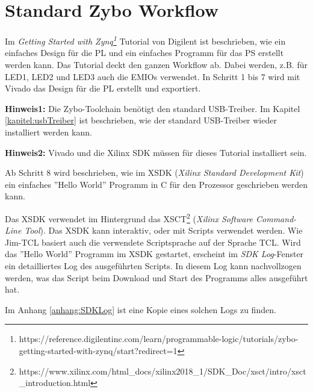 
\section{Standard Zybo Workflow}
Im \textit{Getting Started with Zynq\footnote{https://reference.digilentinc.com/learn/programmable-logic/tutorials/zybo-getting-started-with-zynq/start?redirect=1}} Tutorial von Digilent ist beschrieben, wie ein einfaches Design für die PL und ein einfaches Programm für das PS erstellt werden kann.
Das Tutorial deckt den ganzen Workflow ab.
Dabei werden, z.B. für LED1, LED2 und LED3 auch die EMIOs verwendet.
In Schritt 1 bis 7 wird mit Vivado das Design für die PL erstellt und exportiert.

\textbf{Hinweis1:} Die Zybo-Toolchain benötigt den standard USB-Treiber. Im Kapitel \ref{kapitel:usbTreiber} ist beschrieben, wie der standard USB-Treiber wieder installiert werden kann.

\textbf{Hinweis2:} Vivado und die Xilinx SDK müssen für dieses Tutorial installiert sein.

Ab Schritt 8 wird beschrieben, wie im XSDK (\textit{Xilinx Standard Development Kit}) ein einfaches ''Hello World'' Programm in C für den Prozessor geschrieben werden kann.

Das XSDK verwendet im Hintergrund das XSCT\footnote{https://www.xilinx.com/html\_docs/xilinx2018\_1/SDK\_Doc/xsct/intro/xsct\_introduction.html} (\textit{Xilinx Software Command-Line Tool}).
Das XSDK kann interaktiv, oder mit Scripts verwendet werden.
Wie Jim-TCL basiert auch die verwendete Scriptsprache auf der Sprache TCL.
Wird das ''Hello World'' Programm im XSDK gestartet, erscheint im \textit{SDK Log}-Fenster ein detailliertes Log des ausgeführten Scripts.
In diesem Log kann nachvollzogen werden, was das Script beim Download und Start des Programms alles ausgeführt hat.

Im Anhang \ref{anhang:SDKLog} ist eine Kopie eines solchen Logs zu finden.

